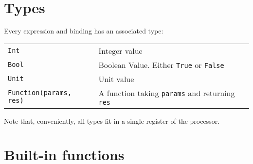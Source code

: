 \documentclass[a4paper, 11pt]{article}
\begin{document}
\section{Types}

Every expression and binding has an associated type:\\[1.5ex]
\begin{tabularx}{\linewidth}{lX}
  \texttt{Int} & Integer value\\
  \texttt{Bool} & Boolean Value. Either \texttt{True} or
  \texttt{False}\\
  \texttt{Unit} & Unit value\\
  \texttt{Function(params, res)} & A function taking \texttt{params}
  and returning \texttt{res}\\
\end{tabularx}

Note that, conveniently, all types fit in a single register of the
processor.

\section{Built-in functions}
\end{document}
